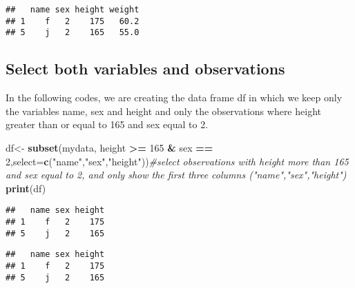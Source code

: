 \documentclass[]{book}
\newenvironment{Shaded}{\begin{snugshade}}{\end{snugshade}}
\newcommand{\KeywordTok}[1]{\textcolor[rgb]{0.13,0.29,0.53}{\textbf{#1}}}
\newcommand{\DataTypeTok}[1]{\textcolor[rgb]{0.13,0.29,0.53}{#1}}
\newcommand{\DecValTok}[1]{\textcolor[rgb]{0.00,0.00,0.81}{#1}}
\newcommand{\StringTok}[1]{\textcolor[rgb]{0.31,0.60,0.02}{#1}}
\newcommand{\CommentTok}[1]{\textcolor[rgb]{0.56,0.35,0.01}{\textit{#1}}}
\newcommand{\OperatorTok}[1]{\textcolor[rgb]{0.81,0.36,0.00}{\textbf{#1}}}
\newcommand{\NormalTok}[1]{#1}
\theoremstyle{definition}
\theoremstyle{definition}
\theoremstyle{definition}
\theoremstyle{remark}
\begin{document}
\begin{verbatim}
##   name sex height weight
## 1    f   2    175   60.2
## 5    j   2    165   55.0
\end{verbatim}

\subsection{Select both variables and
observations}\label{select-both-variables-and-observations}

In the following codes, we are creating the data frame df in which we
keep only the variables name, sex and height and only the observations
where height greater than or equal to 165 and sex equal to 2.

\begin{Shaded}
\begin{Highlighting}[]
\NormalTok{df<-}\StringTok{ }\KeywordTok{subset}\NormalTok{(mydata, height }\OperatorTok{>=}\StringTok{ }\DecValTok{165} \OperatorTok{&}\StringTok{ }\NormalTok{sex }\OperatorTok{==}\StringTok{ }\DecValTok{2}\NormalTok{,}\DataTypeTok{select=}\KeywordTok{c}\NormalTok{(}\StringTok{"name"}\NormalTok{,}\StringTok{"sex"}\NormalTok{,}\StringTok{"height"}\NormalTok{))}\CommentTok{#select observations with height more than 165 and sex equal to 2, and only show the first three columns ("name","sex","height")}
\KeywordTok{print}\NormalTok{(df)}
\end{Highlighting}
\end{Shaded}

\begin{verbatim}
##   name sex height
## 1    f   2    175
## 5    j   2    165
\end{verbatim}

\begin{Shaded}
\end{Shaded}

\begin{verbatim}
##   name sex height
## 1    f   2    175
## 5    j   2    165
\end{verbatim}
\end{document}
